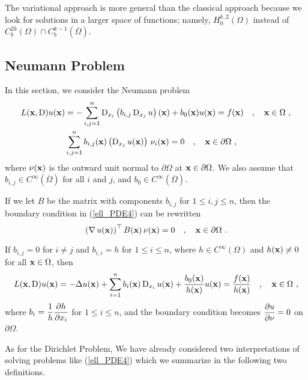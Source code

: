 The variational approach is more general than the classical
approach because we look for solutions in a larger space
of functions; namely, $\displaystyle H^{k,2}_0(\Omega)$ instead of
$\displaystyle C^{2k}_b(\Omega)\cap C^{k-1}_b(\overline{\Omega})$.

\subsection{Neumann Problem}

In this section, we consider the Neumann problem
\begin{equation} \label{ell_PDE4}
\begin{split}
L(\mathbf{x}, \operatorname{D})u(\mathbf{x}) &= -\sum_{i,j=1}^n
\operatorname{D}_{x_i} \left( b_{i,j} \operatorname{D}_{x_j} u \right)(\mathbf{x})
+ b_0(\mathbf{x})u(\mathbf{x}) = f(\mathbf{x})
\quad , \quad \mathbf{x} \in \Omega \ ,\\
& \sum_{i,j=1}^n b_{i,j}(\mathbf{x}) \left( \operatorname{D}_{x_j}u(\mathbf{x}) \right)\,
\nu_i(\mathbf{x})= 0
\quad , \quad \mathbf{x} \in \partial \Omega \ ,
\end{split}
\end{equation}
where $\mathbf{\nu}(\mathbf{x})$ is the outward unit normal to
$\partial \Omega$ at $\mathbf{x} \in \partial \Omega$.  We also assume
that $\displaystyle b_{i,j} \in C^\infty(\overline{\Omega})$ for all
$i$ and $j$, and $\displaystyle b_0 \in C^\infty(\overline{\Omega})$.

If we let $B$ be the \nn matrix with components $b_{i,j}$ for
$1\leq i,j\leq n$, then the boundary condition in (\ref{ell_PDE4}) can
be rewritten
\[
\left( \operatorname{\nabla} u(\mathbf{x}) \right)^\top B(\mathbf{x})\, \mathbf{\nu}(\mathbf{x}) = 0
\quad , \quad \mathbf{x} \in \partial \Omega \ .
\]

\begin{egg}
If $b_{i,j} = 0$ for $i \neq j$ and              \label{ell_PDE_egg1}
$b_{i,i} = h$ for $1 \leq i \leq n$, where
$\displaystyle h \in C^{\infty}(\Omega)$
and $h(\mathbf{x}) \neq 0$ for all $\mathbf{x} \in \Omega$, then
\[
L(\mathbf{x},\operatorname{D}) u(\mathbf{x})= -\Delta u(\mathbf{x}) + \sum_{i=1}^n
b_i(\mathbf{x}) \operatorname{D}_{x_i} u(\mathbf{x}) +
\frac{b_0(\mathbf{x})}{h(\mathbf{x})}u(\mathbf{x}) = \frac{f(\mathbf{x})}{h(\mathbf{x})}
\quad , \quad \mathbf{x} \in \Omega \ ,
\]
where $\displaystyle b_i = \frac{1}{h}\frac{\partial{h}}{\partial x_i}$ for $1 \leq i \leq n$,
and the boundary condition becomes
$\displaystyle \frac{\partial{u}}{\partial \mathbf{\nu}} = 0$ on $\partial \Omega$.
\end{egg}

As for the Dirichlet Problem, We have already considered two
interpretations of solving problems like (\ref{ell_PDE4}) which we summarize
in the following two definitions.

